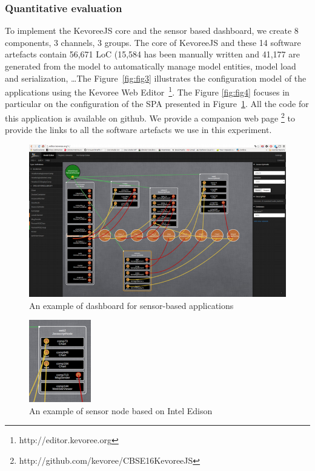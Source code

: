 \subsubsection{Quantitative evaluation}
To implement the KevoreeJS core and the sensor based dashboard, we create 8 components, 3 channels, 3 groups. The core of KevoreeJS and these 14 software artefacts contain 56,671 LoC (15,584 has been manually written and 41,177 are generated from the model to automatically manage model entities, model load and serialization, \dots The Figure~\ref{fig:fig3}  illustrates the configuration model of the applications using the Kevoree Web Editor~\footnote{http://editor.kevoree.org}. The Figure \ref{fig:fig4} focuses in particular on the configuration of the SPA presented in Figure~\ref{fig:fig1}. All the code for this application is available on github. We provide a companion web page \footnote{http://github.com/kevoree/CBSE16KevoreeJS} to provide the links to all the software artefacts we use in this experiment.  


\begin{figure}[h]
	\centering
	\includegraphics[width=1\linewidth]{figures/fig1}
	\caption{An example of dashboard for sensor-based applications}
	\label{fig:fig1}
\end{figure}


\begin{figure}[h]
	\centering
	\includegraphics[width=0.5\linewidth]{figures/fig2}
	\caption{An example of sensor node based on Intel Edison}
	\label{fig:fig2}
\end{figure}


